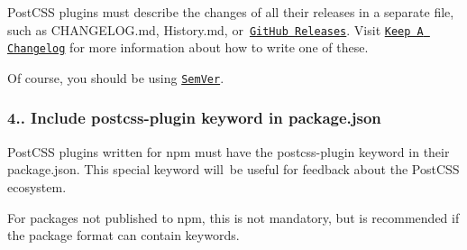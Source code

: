 Post\+C\+SS plugins must describe the changes of all their releases in a separate file, such as {\ttfamily C\+H\+A\+N\+G\+E\+L\+O\+G.\+md}, {\ttfamily History.\+md}, or \href{https://help.github.com/articles/creating-releases/}{\tt Git\+Hub Releases}. Visit \href{http://keepachangelog.com/}{\tt Keep A Changelog} for more information about how to write one of these.

Of course, you should be using \href{http://semver.org/}{\tt Sem\+Ver}.

\subsubsection*{4.. Include {\ttfamily postcss-\/plugin} keyword in {\ttfamily package.\+json}}

Post\+C\+SS plugins written for npm must have the {\ttfamily postcss-\/plugin} keyword in their {\ttfamily package.\+json}. This special keyword will be useful for feedback about the Post\+C\+SS ecosystem.

For packages not published to npm, this is not mandatory, but is recommended if the package format can contain keywords. 